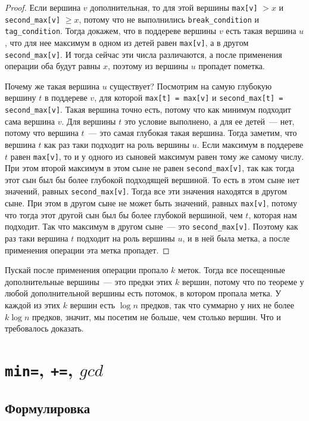 \begin{proof}
    Если вершина $v$ дополнительная, то для этой вершины \verb+max[v]+ $> x$ и \verb+second_max[v]+ $\ge x$, потому что не выполнились \verb+break_condition+ и \verb+tag_condition+. Тогда докажем, что в поддереве вершины $v$ есть такая вершина $u$, что для нее максимум в одном из детей равен \verb+max[v]+, а в другом \verb+second_max[v]+. И тогда сейчас эти числа различаются, а после применения операции оба будут равны $x$, поэтому из вершины $u$ пропадет пометка.

    Почему же такая вершина $u$ существует? Посмотрим на самую глубокую вершину $t$ в поддереве $v$, для которой \verb+max[t] = max[v]+ и \verb+second_max[t] = second_max[v]+. Такая вершина точно есть, потому что как минимум подходит сама вершина $v$. Для вершины $t$ это условие выполнено, а для ее детей~--- нет, потому что вершина $t$~--- это самая глубокая такая вершина. Тогда заметим, что вершина $t$ как раз таки подходит на роль вершины $u$. Если максимум в поддереве $t$ равен \verb+max[v]+, то и у одного из сыновей максимум равен тому же самому числу. При этом второй максимум в этом сыне не равен \verb+second_max[v]+, так как тогда этот сын был бы более глубокой подходящей вершиной. То есть в этом сыне нет значений, равных \verb+second_max[v]+. Тогда все эти значения находятся в другом сыне. При этом в другом сыне не может быть значений, равных \verb+max[v]+, потому что тогда этот другой сын был бы более глубокой вершиной, чем $t$, которая нам подходит. Так что максимум в другом сыне~--- это \verb+second_max[v]+. Поэтому как раз таки вершина $t$ подходит на роль вершины $u$, и в ней была метка, а после применения операции эта метка пропадет.
\end{proof}

Пускай после применения операции пропало $k$ меток. Тогда все посещенные дополнительные вершины~--- это предки этих $k$ вершин, потому что по теореме у любой дополнительной вершины есть потомок, в котором пропала метка. У каждой из этих $k$ вершин есть $\log n$ предков, так что суммарно у них не более $k \log n$ предков, значит, мы посетим не больше, чем столько вершин. Что и требовалось доказать.




\cprotect \section{\verb+min=+, \verb^+=^, $gcd$}

\subsection{Формулировка}


